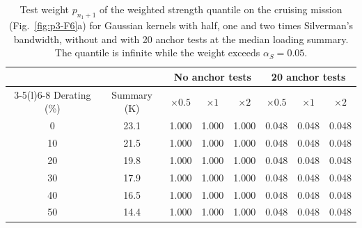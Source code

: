 \begin{table}[htbp]
\centering
\caption{Test weight $p_{n_1+1}$ of the weighted strength quantile on the cruising mission (Fig.~\ref{fig:p3-F6}a) for
Gaussian kernels with half, one and two times Silverman's bandwidth, without and with 20 anchor tests at the median
loading summary. The quantile is infinite while the weight exceeds $\alpha_S=0.05$.}
\label{tab:S2}
\small
\begin{tabular*}{\textwidth}{@{\extracolsep{\fill}}cccccccc@{}}
\toprule
& & \multicolumn{3}{c}{No anchor tests} & \multicolumn{3}{c}{20 anchor tests} \\
\cmidrule(lr){3-5}\cmidrule(l){6-8}
Derating (\%) & Summary (K) & $\times0.5$ & $\times1$ & $\times2$ & $\times0.5$ & $\times1$ & $\times2$ \\
\midrule
0 & 23.1 & 1.000 & 1.000 & 1.000 & 0.048 & 0.048 & 0.048 \\
10 & 21.5 & 1.000 & 1.000 & 1.000 & 0.048 & 0.048 & 0.048 \\
20 & 19.8 & 1.000 & 1.000 & 1.000 & 0.048 & 0.048 & 0.048 \\
30 & 17.9 & 1.000 & 1.000 & 1.000 & 0.048 & 0.048 & 0.048 \\
40 & 16.5 & 1.000 & 1.000 & 1.000 & 0.048 & 0.048 & 0.048 \\
50 & 14.4 & 1.000 & 1.000 & 1.000 & 0.048 & 0.048 & 0.048 \\
\bottomrule
\end{tabular*}
\end{table}
